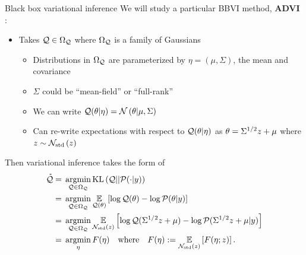 \documentclass[8pt]{beamer}\usepackage[]{graphicx}\usepackage[]{color}
\begin{document}

\begin{frame}[t]{Black box variational inference \citep{blei:2016:variational,ranganath:2014:bbvi}}
%
%
We will study a particular BBVI method, \textbf{ADVI} \citep{kucukelbir:2017:advi}:
%
\begin{itemize}
\item Takes $\mathcal{Q} \in \Omega_{\mathcal{Q}}$ where $\Omega_{\mathcal{Q}}$ is a family of Gaussians
%
\begin{itemize}
\item Distributions in $\Omega_{\mathcal{Q}}$ are parameterized by $\eta = (\mu, \Sigma)$, the mean and covariance 
\item $\Sigma$ could be ``mean-field'' or ``full-rank''
\item We can write $\mathcal{Q}(\theta \vert \eta) = \mathcal{N}\left(\theta \vert \mu, \Sigma\right)$
\item Can re-write expectations with respect to $\mathcal{Q}(\theta \vert \eta)$ as 
        $\theta = \Sigma^{1/2}z + \mu$ where $z \sim \mathcal{N}_{\mathrm{std}}\left(z\right)$
\end{itemize}
\end{itemize}
%
\pause

Then variational inference takes the form of
\begin{align*}
%
\qstar ={}& 
\argmin_{\q \in \qdom} \kl{\q}{\p(\cdot \vert \y)}
\\={}& \argmin_{\q \in \qdom}  \expect{\q(\theta)}{\log \q(\theta) - \log \post}
\\={}& \argmin_{\q \in \qdom}  \expect{\normz}{\log \q(\Sigma^{1/2}\z + \mu) - \log \p(\Sigma^{1/2}\z + \mu \vert \y)}
\\={}& \argmin_{\eta} F(\eta) 
\quad\textrm{where}\quad F(\eta) := \expect{\normz}{F(\eta; \z)}.
%
\end{align*}
%


\end{frame}
\end{document}
